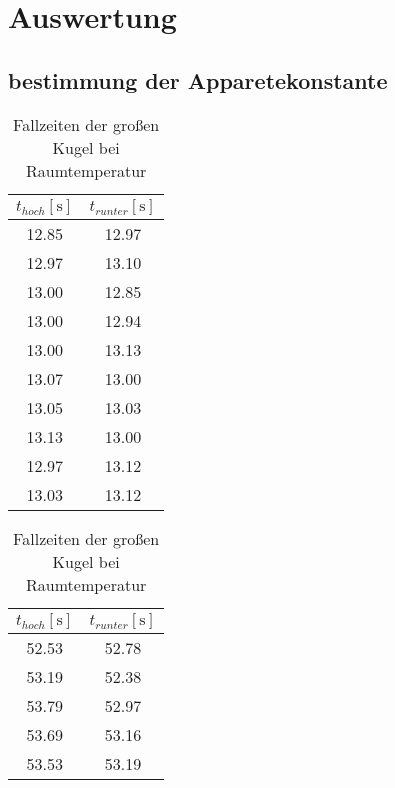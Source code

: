 \section{Auswertung}
\label{sec:Auswertung}


\subsection{bestimmung der Apparetekonstante}
\begin{table}[H]
  \begin{minipage}{0.5\linewidth}
    \centering
    \begin{tabular}{c|c}
      \toprule
      {$t_{hoch}\left[\unit{\s}\right]$} & {$t_{runter}\left[\unit{\s}\right]$}\\
      \midrule
      12.85 & 12.97\\
      12.97 & 13.10\\
      13.00 & 12.85\\
      13.00 & 12.94\\
      13.00 & 13.13\\
      13.07 & 13.00\\
      13.05 & 13.03\\
      13.13 & 13.00\\
      12.97 & 13.12\\
      13.03 & 13.12\\
      \bottomrule
    \end{tabular}
    \vspace{5pt}
    \caption{Fallzeiten der kleinen\\ Kugel bei Raumtemperatur}
    \label{table:kk}
  \end{minipage}
  \begin{minipage}{0.5\linewidth}
    \centering
    \begin{tabular}{c|c}
      \toprule
      {$t_{hoch}\left[\unit{\s}\right]$} & {$t_{runter}\left[\unit{\s}\right]$}\\
      \midrule
      52.53 & 52.78\\
      53.19 & 52.38\\
      53.79 & 52.97\\
      53.69 & 53.16\\
      53.53 & 53.19\\
      \bottomrule
    \end{tabular}
    \vspace{5pt}
    \caption{Fallzeiten der großen\\ Kugel bei Raumtemperatur}
    \label{table:gk}
  \end{minipage}
\end{table}

